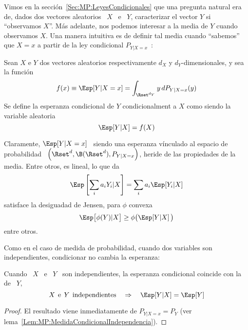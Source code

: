 \label{Sec:MP:EsperanzaCondicional}

Vimos en  la secci\'on~\ref{Sec:MP:LeyesCondicionales} que  una pregunta natural
era de, dados  dos vectores aleatorios \  $X$ \ e \ $Y$,  caracterizar el vector
$Y$ si ``observamos $X$''.  M\'as adelante,  nos podemos interesar a la media de
$Y$ cuando observamos  $X$. Una manera intuitiva es de  definir tal media cuando
``sabemos'' que  $X=x$ a partir  de la ley  condicional $P_{Y|X=x}$~\cite{Fel68,
  Fel71, AthLah06, Spi76, Kol56, JacPro03, Bil12}:

\begin{definicion}
  Sean   $X$   e  $Y$   dos   vectores   aleatorios   respectivamente  $d_X$   y
  $d_Y$-dimensionales, y sea la funci\'on
  \[
  f(x) \equiv \Esp[Y | X=x ] = \int_{\Rset^{d_Y}} y \, dP_{Y|X=x}(y)
  \]
  Se define la esperanza condicional de $Y$ condicionalment a $X$ como siendo la
  variable aleatoria
  \[
  \Esp[Y|X] = f(X)
  \]
\end{definicion}

Claramente, $\Esp[Y  | X=x]$  \ siendo una  esperanza v\'inculado al  espacio de
probabilidad \ $\left( \Rset^d , \B(\Rset^d) , P_{Y|X=x} \right)$, heride de las
propiedades de la media. Entre otros, es lineal, lo que da
%
\[
\Esp\left[ \sum_i a_i Y_i | X \right] = \sum_i a_i \Esp[Y_i|X]
\]
%
satisface la desiguadad de Jensen, para $\phi$ convexa
%
\[
\Esp\big[ \phi(Y) | X \big] \ge \phi\big( \Esp[Y|X] \, \big)
\]
%
entre otros.

Como  en  el   caso  de  medida  de  probabilidad,   cuando  dos  variables  son
independientes, condicionar no cambia la esperanza:
%
\begin{lema}
\label{Lem:MP:EperanzaondicionalIndependencia}
%
  Cuando \ $X$ \ e \ $Y$ \ son independientes, la esperanza condicional coincide
  con la de \ $Y$,
  \[
  X  \:\: \mbox{e}  \:\: Y  \:\: \mbox{independientes}  \quad  \Rightarrow \quad
  \Esp[Y|X] = \Esp[Y]
  \]
\end{lema}
\begin{proof}
  El   resultado    viene   inmediatamente    de   $P_{Y|X=x}   =    P_Y$   (ver
  lema~\ref{Lem:MP:MedidaCondicionalIndependencia}).
\end{proof}

